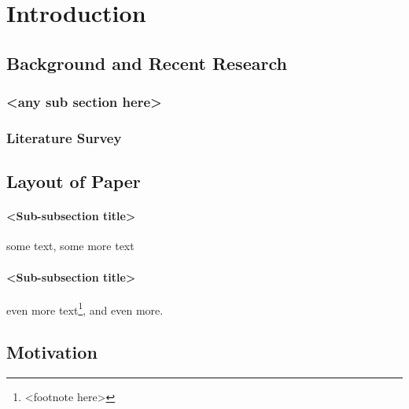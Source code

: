 \chapter{Introduction}

\section{Background and Recent Research}
\subsection{<any sub section here>}

\subsection{Literature Survey}


\section{Layout of Paper}
\subsubsection{<Sub-subsection title>}
some text\cite{citation-1-name-here}, some more text

\subsubsection{<Sub-subsection title>}
even more text\footnote{<footnote here>}, and even more.

\section{Motivation}
